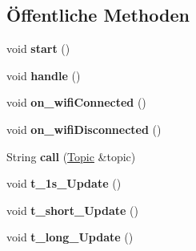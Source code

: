 \subsection*{Öffentliche Methoden}
\begin{DoxyCompactItemize}
\item 
\mbox{\label{class_controller_ad535ad74055e645b7f44b7feeb4e82a8}} 
void {\bfseries start} ()
\item 
\mbox{\label{class_controller_a0fee459be90ca9573b17fca3c8a87efe}} 
void {\bfseries handle} ()
\item 
\mbox{\label{class_controller_a40794552e89c83c124e15d73f7e0a21e}} 
void {\bfseries on\+\_\+wifi\+Connected} ()
\item 
\mbox{\label{class_controller_aa9db3dcb8cdbef1d64724354a233848c}} 
void {\bfseries on\+\_\+wifi\+Disconnected} ()
\item 
\mbox{\label{class_controller_a806760bd84d31ee8caf2a51e160f950c}} 
String {\bfseries call} (\hyperlink{class_topic}{Topic} \&topic)
\item 
\mbox{\label{class_controller_a2dbae78c843af54bee52c6d6ffcb2844}} 
void {\bfseries t\+\_\+1s\+\_\+\+Update} ()
\item 
\mbox{\label{class_controller_ae801dc4b04a716949b296819e02c04f0}} 
void {\bfseries t\+\_\+short\+\_\+\+Update} ()
\item 
\mbox{\label{class_controller_adf58976c2adf11a541e0a7ad7ba653ef}} 
void {\bfseries t\+\_\+long\+\_\+\+Update} ()
\end{DoxyCompactItemize}
